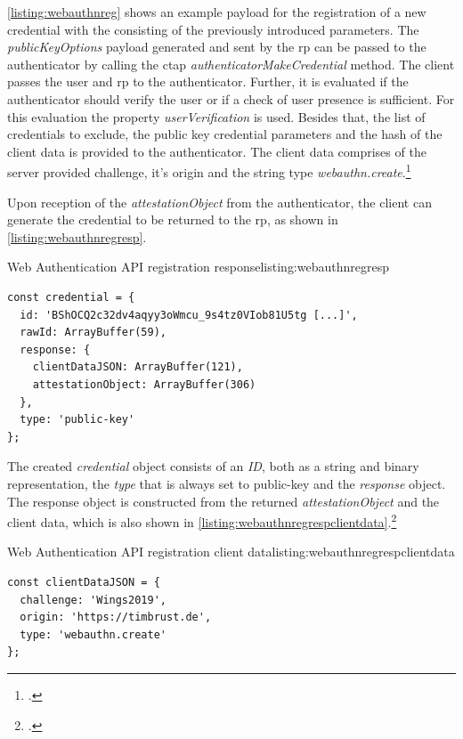 \autoref{listing:webauthnreg} shows an example payload for the registration of a new credential with the \wa{} consisting of the previously introduced parameters. The \textit{publicKeyOptions} payload generated and sent by the \gls{rp} can be passed to the authenticator by calling the \gls{ctap} \textit{authenticatorMakeCredential} method. The client passes the user and \gls{rp} to the authenticator. Further, it is evaluated if the authenticator should verify the user or if a check of user presence is sufficient. For this evaluation the property \textit{userVerification} is used. Besides that, the list of credentials to exclude, the public key credential parameters and the hash of the client data is provided to the authenticator. The client data comprises of the server provided challenge, it's origin and the string type \textit{webauthn.create}.\footcites[See][Chapter 5.4, 6.4.2]{w3c}

Upon reception of the \textit{attestationObject} from the authenticator, the client can generate the credential to be returned to the \gls{rp}, as shown in \autoref{listing:webauthnregresp}.
\\
\begin{example}{Web Authentication API registration response}{listing:webauthnregresp}
\begin{verbatim}
const credential = {
  id: 'BShOCQ2c32dv4aqyy3oWmcu_9s4tz0VIob81U5tg [...]',
  rawId: ArrayBuffer(59),
  response: {
    clientDataJSON: ArrayBuffer(121),
    attestationObject: ArrayBuffer(306)
  },
  type: 'public-key'
};
\end{verbatim}
\end{example}

The created \textit{credential} object consists of an \textit{ID}, both as a string and binary representation, the \textit{type} that is always set to \frqq public-key\flqq{} and the \textit{response} object. The response object is constructed from the returned \textit{attestationObject} and the client data, which is also shown in \autoref{listing:webauthnregrespclientdata}.\footcite[See][Chapter 5.1]{w3c}
\\
\begin{example}{Web Authentication API registration client data}{listing:webauthnregrespclientdata}
\begin{verbatim}
const clientDataJSON = {
  challenge: 'Wings2019',
  origin: 'https://timbrust.de',
  type: 'webauthn.create'
};
\end{verbatim}
\end{example}

